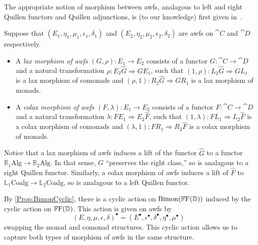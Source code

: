 The appropriate notion of morphism between awfs, analagous to left and right Quillen functors and Quillen adjunctions, is (to our knowledge) first given in~\cite{riehl:nwfs-model}.

\begin{definition}
	Suppose that $(E_1,\eta_1,\mu_1,\epsilon_1,\delta_1)$ and $(E_2,\eta_2,\mu_2,\epsilon_2,\delta_2)$ are awfs on $\cat{C}$ and $\cat{D}$ respectively. 
	\begin{itemize}
		\item A \emph{lax morphism of awfs} $(G,\rho)\colon E_1\to E_2$ consists of a functor $G\colon\cat{C}\to\cat{D}$ and a natural transformation $\rho\colon E_2\hat{G}\Rightarrow GE_1$, such that $(1,\rho)\colon L_2\hat{G}\Rightarrow GL_1$ is a lax morphism of comonads and $(\rho,1)\colon R_2\hat{G}\Rightarrow GR_1$ is a lax morphism of monads.
		\item A \emph{colax morphism of awfs} $(F,\lambda)\colon E_1\to E_2$ consists of a functor $F\colon\cat{C}\to\cat{D}$ and a natural transformation $\lambda\colon FE_1\Rightarrow E_2\hat{F}$, such that $(1,\lambda)\colon FL_1\Rightarrow L_2\hat{F}$ is a colax morphism of comonads and $(\lambda,1)\colon FR_1\Rightarrow R_2\hat{F}$ is a colax morphism of monads.
	\end{itemize}
\end{definition}

Notice that a lax morphism of awfs induces a lift of the functor $\hat{G}$ to a functor $\mathbb{R}_1\mathrm{Alg}\to \mathbb{R}_2\mathrm{Alg}$. In that sense, $G$ ``preserves the right class,'' so is analagous to a right Quillen functor. Similarly, a colax morphism of awfs induces a lift of $\hat{F}$ to $\mathbb{L}_1\mathrm{Coalg}\to\mathbb{L}_2\mathrm{Coalg}$, so is analagous to a left Quillen functor.

By \cref{Prop:BimonCyclic}, there is a cyclic action on $\mathrm{Bimon}(\mathbb{F}\mathrm{F}(\mathbb{D}))$ induced by the cyclic action on $\mathbb{F}\mathrm{F}(\mathbb{D})$. This action is given on awfs by
\[
	(E,\eta,\mu,\epsilon,\delta)^{\bullet} = (E^{\bullet},\epsilon^{\bullet},\delta^{\bullet},\eta^{\bullet},\mu^{\bullet})
\]
swapping the monad and comonad structures. This cyclic action allows us to capture both types of morphism of awfs in the same structure.

